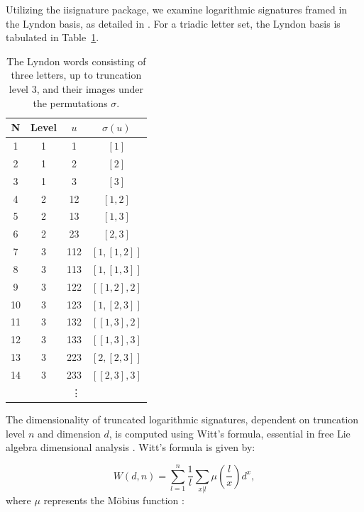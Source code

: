Utilizing the iisignature package, we examine logarithmic signatures framed in the Lyndon basis, as detailed in \cite{reizensteinCalculationIteratedIntegralSignatures2017}. For a triadic letter set, the Lyndon basis is tabulated in Table~\ref{tab:log_signatures}.

\begin{table}
    \centering
    \begin{tabular}{|c|c|c|c|}
    \hline
    \textbf{N} & \textbf{Level} & \textbf{\( u \)} & \textbf{\( \sigma(u) \)} \\
    \hline
    1 & 1 & 1 & \([1]\) \\
    2 & 1 & 2 & \([2]\) \\
    3 & 1 & 3 & \([3]\) \\
    \hline
    4 & 2 & 12 & \([1, 2]\) \\
    5 & 2 & 13 & \([1, 3]\) \\
    6 & 2 & 23 & \([2, 3]\) \\
    \hline
    7 & 3 & 112 & \([1,[1,2]]\) \\
    8 & 3 & 113 & \([1,[1,3]]\) \\
    9 & 3 & 122 & \([[1,2],2]\) \\
    10 & 3 & 123 & \([1,[2,3]]\) \\
    11 & 3 & 132 & \([[1,3],2]\) \\
    12 & 3 & 133 & \([[1,3],3]\) \\
    13 & 3 & 223 & \([2,[2,3]]\) \\
    14 & 3 & 233 & \([[2,3],3]\) \\
    \hline
    \multicolumn{4}{|c|}{\vdots} \\
    \hline
    \end{tabular}
    \caption{The Lyndon words consisting of three letters, up to truncation level 3, and their images under the permutations \(\sigma\).}
    \label{tab:log_signatures}
\end{table}

The dimensionality of truncated logarithmic signatures, dependent on truncation level \( n \) and dimension \( d \), is computed using Witt's formula, essential in free Lie algebra dimensional analysis \cite{metropolisWittVectorsAlgebra1983}. Witt's formula is given by:

\begin{equation}
    W(d, n) = \sum_{l=1}^{n} \frac{1}{l} \sum_{x | l} \mu\left(\frac{l}{x}\right) d^x,
\end{equation}
where \( \mu \) represents the Möbius function \cite{delegliseComputingSummationMobius1996}:

